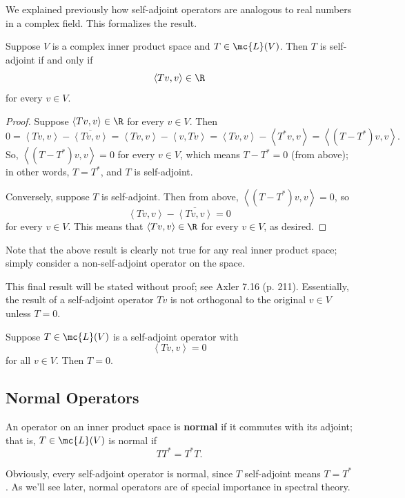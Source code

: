\documentclass[math0540-lecture-notes.tex]{subfiles}
\begin{document}
We explained previously how self-adjoint operators are analogous to real numbers in a complex field.
This formalizes the result.

\begin{proposition}{}
  Suppose $V$ is a complex inner product space and $T\in \mc{L}(V)$. Then $T$ is self-adjoint if and
  only if \[
    \left<Tv,v \right> \in \R
  \] for every $v\in V$.
\end{proposition}
\begin{proof}[Proof]
  Suppose $\left<Tv,v \right> \in \R$ for every $v\in V$. Then \[
    0=\left<Tv,v \right> -\overline{\left<Tv,v \right> }=\left<Tv,v \right> -\left<v,Tv \right>
    =\left<Tv,v \right> -\left<T^*v,v \right> =\left<(T-T^*)v,v \right> 
  .\] So, $\left<(T-T^*)v,v \right> =0$ for every $v\in V$, which means $T-T^*=0$ (from above); in
  other words, $T=T^*$, and $T$ is self-adjoint.

  Conversely, suppose $T$ is self-adjoint. Then from above, $\left<(T-T^*)v,v \right> =0$, so \[
  \left<Tv,v \right> -\overline{\left<Tv,v \right> }=0
  \] for every $v\in V$. This means that $\left<Tv,v \right> \in \R$ for every $v\in V$, as desired.
\end{proof}

Note that the above result is clearly not true for any real inner product space; simply consider a
non-self-adjoint operator on the space.

This final result will be stated without proof; see Axler 7.16 (p. 211). Essentially, the result of
a self-adjoint operator $Tv$ is not orthogonal to the original $v\in V$ unless $T=0$.
\begin{proposition}{}
  Suppose $T\in \mc{L}(V)$ is a self-adjoint operator with \[
    \left<Tv,v \right> =0
  \] for all $v\in V$. Then $T=0$.
\end{proposition}

\subsection{Normal Operators}
\begin{definition}{}
  An operator on an inner product space is \textbf{normal} if it commutes with its adjoint; that is,
  $T\in \mc{L}(V)$ is normal if \[
    TT^*=T^*T
  .\] 
\end{definition}

Obviously, every self-adjoint operator is normal, since $T$ self-adjoint means $T=T^*$. As we'll see
later, normal operators are of special importance in spectral theory.
\end{document}
